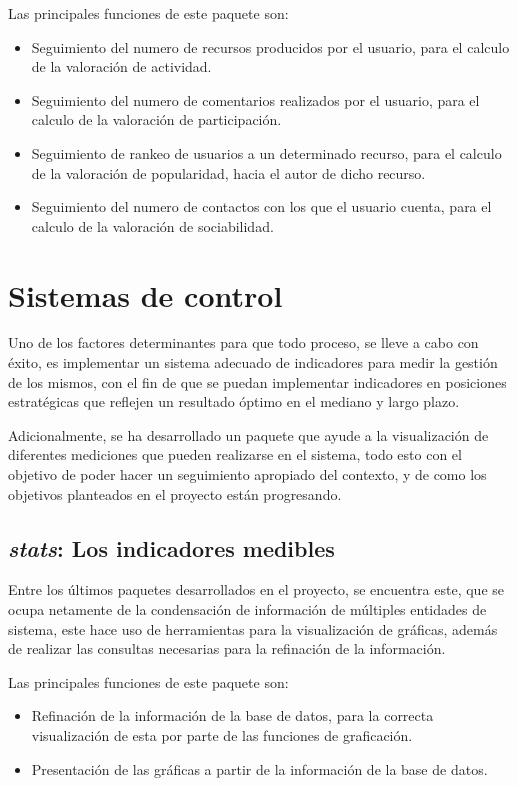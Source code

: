 Las principales funciones de este paquete son:
\begin{itemize}
\item Seguimiento del numero de recursos producidos por el usuario, para el
calculo de la valoración de actividad.
\item Seguimiento del numero de comentarios realizados por el usuario, para el
calculo de la valoración de participación.
\item Seguimiento de rankeo de usuarios a un determinado recurso, para el
calculo de la valoración de popularidad, hacia el autor de dicho recurso.
\item Seguimiento del numero de contactos con los que el usuario cuenta, para el
calculo de la valoración de sociabilidad.
\end{itemize}

\section{Sistemas de control}
Uno de los factores determinantes para que todo proceso, se lleve a cabo con
éxito, es implementar un sistema adecuado de indicadores para medir la gestión
de los mismos, con el fin de que se puedan implementar indicadores en posiciones
estratégicas que reflejen un resultado óptimo en el mediano y largo
plazo\cite{Silva}.

Adicionalmente, se ha desarrollado un paquete que ayude a la visualización de
diferentes mediciones que pueden realizarse en el sistema, todo esto con el
objetivo de poder hacer un seguimiento apropiado del contexto, y de como los
objetivos planteados en el proyecto están progresando.

\subsection{\emph{stats}: Los indicadores medibles}
Entre los últimos paquetes desarrollados en el proyecto, se encuentra este, que
se ocupa netamente de la condensación de información de múltiples entidades de
sistema, este hace uso de herramientas para la visualización de gráficas, además
de realizar las consultas necesarias para la refinación de la información.

Las principales funciones de este paquete son:

\begin{itemize}
\item Refinación de la información de la base de datos, para la correcta
visualización de esta por parte de las funciones de graficación.
\item Presentación de las gráficas a partir de la información de la base de
datos.
\end{itemize}

